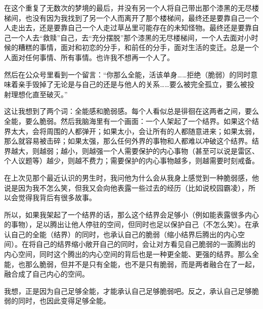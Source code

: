在这个重复了无数次的梦境的最后，并没有另一个人将自己带出那个漆黑的无尽楼梯间，也没有因为我找到了另一个人而离开了那个楼梯间，最终还是要靠自己一个人走出去，还是要靠自己一个人走过草丛里可能存在的未知怪物。最终还是要靠自己一个人去“救赎”自己，去“充分摆脱”那个漆黑的无尽楼梯间，一个人去面对小时候的糟糕的事情，面对和初恋的分手，和前任的分手，面对生活的变迁。总是一个人面对任何事情、所有事情。也许我不想再一个人了。

然后在公众号里看到一个留言：“你那么全能，活该单身……拒绝（脆弱）的同时意味着亲手毁掉了无论是与自己的还是与他人的关系……要么被完全孤立，要么被投射理想化直至破灭。”

这让我想到了两个词：全能感和脆弱感。每个人看似总是徘徊在这两者之间，要么全能，要么脆弱。然后我脑海里有一个画面：一个人架起了一个结界。如果这个结界太大，会将周围的人都弹开；如果太小，会让所有的人都随意进来；如果太弱，那么就容易被击碎；如果太强，那么任何外界的事物和人都难以冲破这个结界。结界越大，则越弱；越小，则越强\pozhehao{}一个人需要保护的内心事物（甚至可以说是雷区、个人议题等）越少，则越不费力；需要保护的内心事物越多，则越需要时刻戒备。

在上次见那个最近认识的男生时，我问他为什么会从我身上感觉到一种脆弱感，他说是因为我不怎么笑，但我又会向他表露一些过去的经历（比如说校园霸凌），所以会觉得我背后有很多故事。

所以，如果我架起了一个结界的话，那么这个结界会足够小（例如能表露很多内心的事物），足以腾出让他人停驻的空间，但同时也足以保护自己（不怎么笑）。在承认自己的全能（结界）的同时，也承认自己的脆弱（缩小结界后腾出的内心空间）。在将自己的结界缩小\pozhehao{}敞开自己的同时，会让对方看见自己脆弱的一面\pozhehao{}腾出的内心空间，同时这个腾出的内心空间的背后也是一种更全能、更强的结界。那么全能，也那么脆弱，但并不是只有全能，也不是只有脆弱，而是两者融合在了一起，融合成了自己内心的空间。

我想，正是因为自己足够全能，才能承认自己足够脆弱吧。反之，承认自己足够脆弱的同时，也因此变得足够全能。

